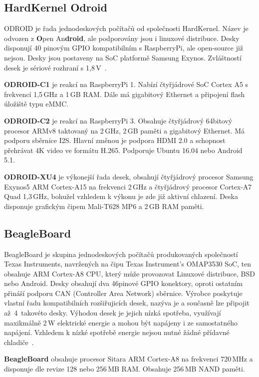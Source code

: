 \subsection{HardKernel Odroid}
	\label{KapKernel}
ODROID je řada jednodeskových počítačů od společnosti HardKernel. Název je odvozen z \textbf{O}pen An\textbf{droid}, ale podporovány jsou i linuxové distribuce. Desky disponují 40 pinovým GPIO kompatibilním s RaspberryPi, ale open-source již nejsou. Desky jsou postaveny na SoC platformě Samsung Exynos. Zvláštností desek je sériové rozhraní s 1,8\,V~\cite{HardKernel}.
	
	\textbf{ODROID-C1} je reakcí na RaspberryPi 1. Nabízí čtyřjádrové SoC Cortex A5 s frekvencí 1,5\,GHz a 1\,GB RAM. Dále má gigabitový Ethernet a připojení flash úložiště typu eMMC. 

	\textbf{ODROID-C2} je reakcí na RaspberryPi 3. Obsahuje čtyřjádrový 64bitový procesor ARMv8 taktovaný na 2\,GHz, 2\,GB paměti a gigabitový Ethernet. Má podporu sběrnice I2S. Hlavní změnou je podpora HDMI 2.0 a schopnost přehrávat 4K video ve formátu H.265. Podporuje Ubuntu 16.04 nebo Android 5.1. 
	
	\textbf{ODROID-XU4} je výkonejší řada desek, obsahují čtyřjádrový procesor Samsung Exynos5 ARM Cortex-A15 na frekvenci 2\,GHz a čtyřjádrový procesor Cortex-A7 Quad 1,3\,GHz, bohužel vzhledem k výkonu je zde již aktivní chlazení. Deska disponuje grafickým čipem Mali-T628 MP6 a 2\,GB RAM paměti.

	
\subsection{BeagleBoard }
BeagleBoard je skupina jednodeskových počítačů produkovaných společností Texas Instruments, navržených na čipu Texas Instrument's OMAP3530 SoC, ten obsahuje ARM Cortex-A8 CPU, který může provozovat Linuxové distribuce, BSD nebo Android. Desky obsahují dva 46pinové GPIO konektory, oproti ostatním přináší podporu CAN (Controller Area Network) sběrnice. Výrobce poskytuje vlastní řadu kompatibilních rozšiřujicích desek, nazýva je  a současně lze připojit až~4~takovéto desky. Výhodou desek je jejich nízká spotřeba, využívají maxikmálně 2\,W elektrické energie a mohou být napájeny i ze samostatného napájení. Vzhledem k nízké spotřebě energie nejsou nutné žádné přídavné chladiče~\cite{BeagleBone}.

\textbf{BeagleBoard} obsahuje procesor Sitara ARM Cortex-A8 na frekvenci 720\,MHz a disponuje dle revize 128 nebo 256\,MB RAM. Obsahuje 256\,MB NAND paměti.

